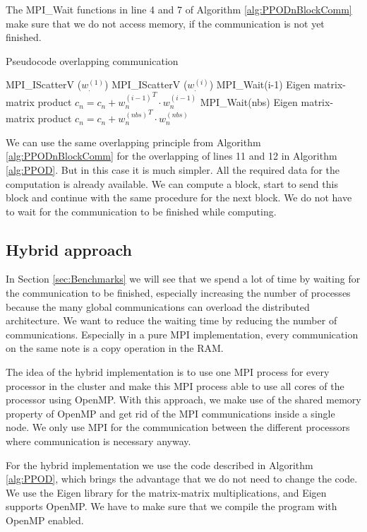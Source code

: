 The MPI\_Wait functions in line 4 and 7 of Algorithm \ref{alg:PPODnBlockComm} make sure that we do not access memory, if the communication is not yet finished.

\begin{algorithm}[H]
\caption{Pseudocode overlapping communication}
\begin{algorithmic}[1]
\State MPI\_IScatterV ($w_.^{(1)}$)
	\State MPI\_IScatterV ($w_.^{(i)}$)
	\State MPI\_Wait(i-1)
	\State Eigen matrix-matrix product $c_n = c_n + {w_n^{(i-1)}}^T\cdot w_n^{(i-1)}$
\EndFor
\State MPI\_Wait(nbs)
\State Eigen matrix-matrix product $c_n = c_n + {w_n^{(nbs)}}^T\cdot w_n^{(nbs)}$
\end{algorithmic}
\label{alg:PPODnBlockComm}
\end{algorithm}

We can use the same overlapping principle from Algorithm \ref{alg:PPODnBlockComm} for the overlapping of lines 11 and 12 in Algorithm \ref{alg:PPOD}.
But in this case it is much simpler.
All the required data for the computation is  already available.
We can compute a block, start to send this block and continue with the same procedure for the next block. We do not have to wait for the communication to be finished while computing.



\subsection{Hybrid approach}
\label{sec:hybimlementaion}
In Section \ref{sec:Benchmarks} we will see that we spend a lot of time by waiting for the communication to be finished,
especially increasing the number of processes because the many global communications can overload the distributed architecture.
We want to reduce the waiting time by reducing the number of communications.
Especially in a pure MPI implementation, every communication on the same note is a copy operation in the RAM.

The idea of the hybrid implementation is to use one MPI process for every processor in the cluster and make this MPI process able to use all cores of the processor using OpenMP.
With this approach, we make use of the shared memory property of OpenMP and get rid of the MPI communications inside a single node.
We only use MPI for the communication between the different processors where communication is necessary anyway.

For the hybrid implementation we use the code described in Algorithm \ref{alg:PPOD},
which brings the advantage that we do not need to change the code.
We use the Eigen library for the matrix-matrix multiplications, and Eigen supports OpenMP.
We have to make sure that we compile the program with OpenMP enabled.
















